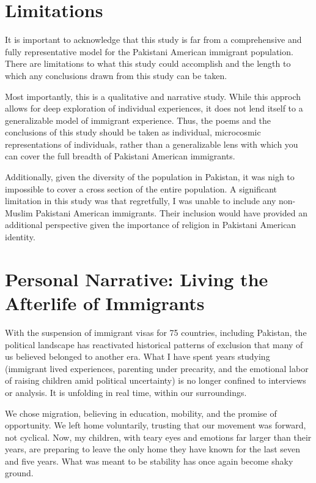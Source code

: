 \section{Limitations}

It is important to acknowledge that this study is far from a comprehensive and fully representative model for the Pakistani American immigrant population. There are limitations to what this study could accomplish and the length to which any conclusions drawn from this study can be taken.

Most importantly, this is a qualitative and narrative study. While this approch allows for deep exploration of individual experiences, it does not lend itself to a generalizable model of immigrant experience. Thus, the poems and the conclusions of this study should be taken as individual, microcosmic representations of individuals, rather than a generalizable lens with which you can cover the full breadth of Pakistani American immigrants.

Additionally, given the diversity of the population in Pakistan, it was nigh to impossible to cover a cross section of the entire population. A significant limitation in this study was that regretfully, I was unable to include any non-Muslim Pakistani American immigrants. Their inclusion would have provided an additional perspective given the importance of religion in Pakistani American identity.

\section{Personal Narrative: Living the Afterlife of Immigrants}

With the suspension of immigrant visas for 75 countries, including Pakistan, the political landscape has reactivated historical patterns of exclusion that many of us believed belonged to another era. What I have spent years studying (immigrant lived experiences, parenting under precarity, and the emotional labor of raising children amid political uncertainty) is no longer confined to interviews or analysis. It is unfolding in real time, within our surroundings.

We chose migration, believing in education, mobility, and the promise of opportunity. We left home voluntarily, trusting that our movement was forward, not cyclical. Now, my children, with teary eyes and emotions far larger than their years, are preparing to leave the only home they have known for the last seven and five years. What was meant to be stability has once again become shaky ground.

